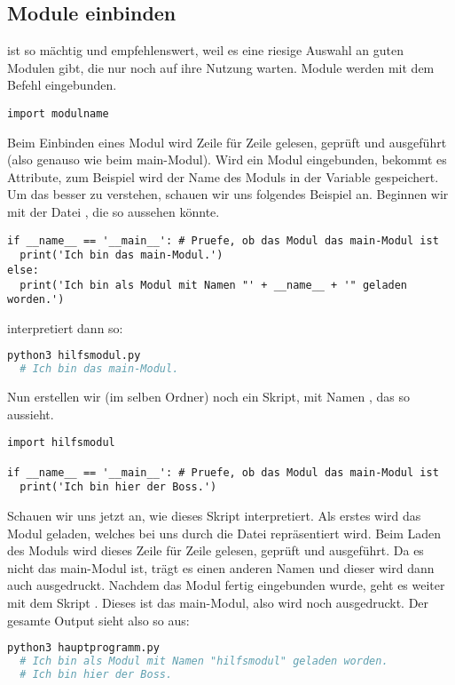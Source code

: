 \subsection{Module einbinden}
\label{section:module:module_einbinden}
\Python ist so mächtig und empfehlenswert, weil es eine riesige Auswahl an guten Modulen gibt, die nur noch auf ihre Nutzung warten.
Module werden mit dem Befehl  eingebunden.
\begin{lstlisting}
import modulname
\end{lstlisting}
Beim Einbinden eines Modul  wird  Zeile für Zeile gelesen, geprüft und ausgeführt (also genauso wie beim main-Modul).
Wird ein Modul eingebunden, bekommt es Attribute, zum Beispiel wird der Name des Moduls in der Variable  gespeichert.
Um das besser zu verstehen, schauen wir uns folgendes Beispiel an.
Beginnen wir mit der Datei , die so aussehen könnte.
\begin{lstlisting}
if __name__ == '__main__': # Pruefe, ob das Modul das main-Modul ist
  print('Ich bin das main-Modul.')
else:
  print('Ich bin als Modul mit Namen "' + __name__ + '" geladen worden.')
\end{lstlisting}
\PythonDrei interpretiert  dann so:
\begin{lstlisting}[language=bash]
python3 hilfsmodul.py
  # Ich bin das main-Modul.
\end{lstlisting}
Nun erstellen wir (im selben Ordner) noch ein \Python Skript, mit Namen , das so aussieht.
\begin{lstlisting}
import hilfsmodul

if __name__ == '__main__': # Pruefe, ob das Modul das main-Modul ist
  print('Ich bin hier der Boss.')
\end{lstlisting}
Schauen wir uns jetzt an, wie \Python dieses Skript interpretiert.
Als erstes wird das Modul  geladen, welches bei uns durch die Datei  repräsentiert wird.
Beim Laden des Moduls  wird dieses Zeile für Zeile gelesen, geprüft und ausgeführt.
Da es nicht das main-Modul ist, trägt es einen anderen Namen und dieser wird dann auch ausgedruckt.
Nachdem das Modul  fertig eingebunden wurde, geht es weiter mit dem Skript .
Dieses ist das main-Modul, also wird noch  ausgedruckt.
Der gesamte Output sieht also so aus:
\begin{lstlisting}[language=bash]
python3 hauptprogramm.py 
  # Ich bin als Modul mit Namen "hilfsmodul" geladen worden.
  # Ich bin hier der Boss.
\end{lstlisting}


